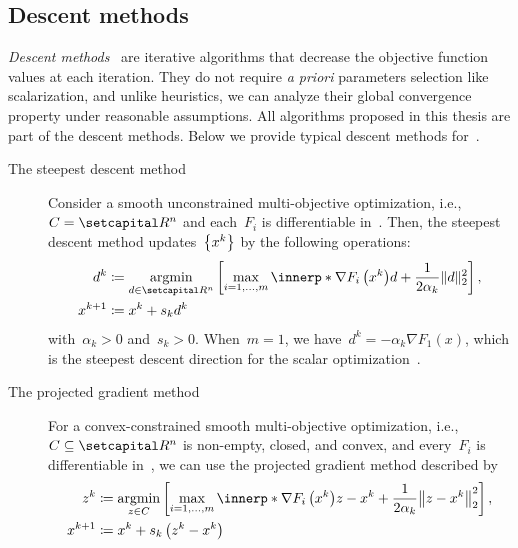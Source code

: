 \documentclass[../../main]{subfiles}
\begin{document}
\subsection{Descent methods} 
\emph{Descent methods}~\cite{Fukuda2014} are iterative algorithms that decrease the objective function values at each iteration.
They do not require \emph{a priori} parameters selection like scalarization, and unlike heuristics, we can analyze their global convergence property under reasonable assumptions.
All algorithms proposed in this thesis are part of the descent methods.
Below we provide typical descent methods for~.

\begin{example} 
    \begin{description}
        \item[The steepest descent method~\cite{Fliege2000,GranaDrummond2005}] Consider a smooth unconstrained multi-objective optimization, i.e.,~$C = \setR^n$ and each~$F_i$ is differentiable in~.
            Then, the steepest descent method updates~$\set*{x^k}$ by the following operations:
            \begin{align} \label{eq:steepest_descent}
                d^k       & \coloneqq \argmin_{d \in \setR^n} \left[ \max_{i = 1, \dots, m} \innerp*{\nabla F_i\left(x^k\right)}{d} + \frac{1}{2 \alpha_k} \norm{d}_2^2 \right], \\
                x^{k + 1} & \coloneqq x^k + s_k d^k
            \end{align}
            with~$\alpha_k > 0$ and~$s_k > 0$.
            When~$m = 1$, we have~$d^k = - \alpha_k \nabla F_1(x)$, which is the steepest descent direction for the scalar optimization~\cite{Cauchy1847}.
        \item[The projected gradient method~\cite{Grana-Drummond2004}] For a convex-constrained smooth multi-objective optimization, i.e.,~$C \subseteq \setR^n$ is non-empty, closed, and convex, and every~$F_i$ is differentiable in~, we can use the projected gradient method described by
            \begin{equation} \label{eq:proj_grad}
                \begin{aligned}
                    z^k       & \coloneqq \argmin_{z \in C} \left[ \max_{i = 1, \dots, m} \innerp*{\nabla F_i\left(x^k\right)}{z - x^k} + \frac{1}{2 \alpha_k} \norm*{z - x^k}_2^2 \right], \\
                    x^{k + 1} & \coloneqq x^k + s_k \left(z^k - x^k \right)

\end{aligned}
\end{equation}
\end{description}
\end{example}
\end{document}
